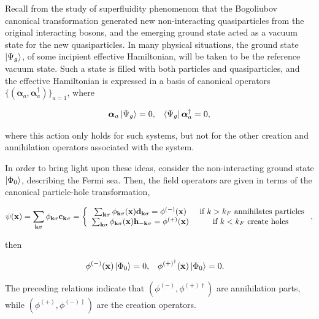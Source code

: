 \documentclass{homework}
\begin{document}
Recall from the study of superfluidity phenomenom that the Bogoliubov canonical transformation generated new non-interacting quasiparticles from the original interacting bosons, and the emerging ground state acted as a vacuum state for the new quasiparticles. 
In many physical situations, the ground state $\ket{\Psi_g}$, of some incipient effective Hamiltonian, will be taken to be the reference vacuum state. Such a state is filled with both particles and quasiparticles, and the effective Hamiltonian is expressed in a basis of canonical operators $\bigg\{({\bm \alpha}_{a}, {\bm \alpha}^\dagger_{a})\bigg\}_{a = 1}$, where 

\begin{align}
    {\bm \alpha}_{a} \ket{\Psi_g} &= 0, & \bra{\Psi_g} {\bm \alpha}_{a}^\dagger = 0,
\end{align}

where this action only holds for such systems, but not for the other creation and annihilation operators associated with the system. \\

\begin{tcolorbox}[colback = yellow, title = Physical Context]

In order to bring light upon these ideas, consider the non-interacting ground state $\ket{\Phi_0}$, describing the Fermi sea. Then, the field operators are given in terms of the canonical particle-hole transformation,

\begin{equation}
    \psi({\bf x}) = \sum_{{\bf k} \sigma} \phi_{{\bf k} \sigma} {\bf c}_{{\bf k} \sigma} = \left\{\begin{array}{cc}
       \sum_{{\bf k} \sigma} \phi_{{\bf k} \sigma}({\bf x}) {\bf d}_{{\bf k} \sigma} = \phi^{(-)}({\bf x}) & \textnormal{ if $k > k_F$ annihilates particles}{} \\
       \sum_{{\bf k} \sigma} \phi_{{\bf k} \sigma}({\bf x}) {\bf h}_{-{\bf k} \sigma} = \phi^{(+)}({\bf x}) & \textnormal{ if $k < k_F$ create holes }{}
    \end{array}\right.,
\end{equation}

then 

\begin{align}
    \phi^{(-)}({\bf x}) \ket{\Phi_0} &= 0, & \phi^{(+)^\dagger}({\bf x}) \ket{\Phi_0} &= 0.
\end{align}

The preceding relations indicate that $(\phi^{(-)}, \phi^{(+)\dagger})$ are annihilation parts, while $(\phi^{(+)}, \phi^{(-)\dagger})$ are the creation operators. 

\end{tcolorbox}
\end{document}
